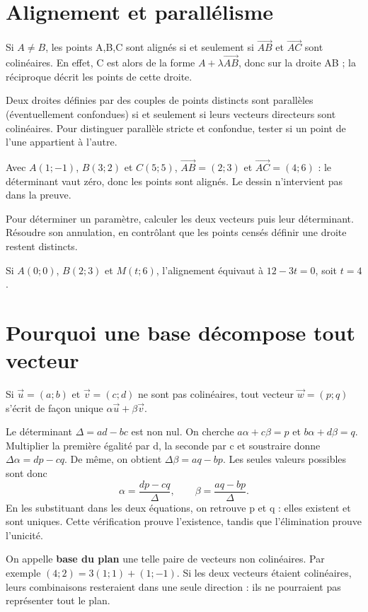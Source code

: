 \documentclass[../cours_2de.tex]{subfiles}
\begin{document}
\section{Alignement et parallélisme}
Si $A\ne B$, les points A,B,C sont alignés si et seulement si $\overrightarrow{AB}$ et $\overrightarrow{AC}$ sont colinéaires. En effet, C est alors de la forme $A+\lambda\overrightarrow{AB}$, donc sur la droite AB ; la réciproque décrit les points de cette droite.

Deux droites définies par des couples de points distincts sont parallèles (éventuellement confondues) si et seulement si leurs vecteurs directeurs sont colinéaires. Pour distinguer parallèle stricte et confondue, tester si un point de l'une appartient à l'autre.
\begin{exemple}
Avec $A(1;-1)$, $B(3;2)$ et $C(5;5)$,
$\overrightarrow{AB}=(2;3)$ et $\overrightarrow{AC}=(4;6)$ : le déterminant vaut zéro, donc les points sont alignés. Le dessin n'intervient pas dans la preuve.
\end{exemple}
\begin{methode}
Pour déterminer un paramètre, calculer les deux vecteurs puis leur déterminant. Résoudre son annulation, en contrôlant que les points censés définir une droite restent distincts.
\end{methode}
Si $A(0;0)$, $B(2;3)$ et $M(t;6)$, l'alignement équivaut à $12-3t=0$, soit $t=4$.
\section{Pourquoi une base décompose tout vecteur}
\begin{theoreme}
Si $\vec u=(a;b)$ et $\vec v=(c;d)$ ne sont pas colinéaires, tout vecteur $\vec w=(p;q)$ s'écrit de façon unique $\alpha\vec u+\beta\vec v$.
\end{theoreme}
\begin{demonstration}
Le déterminant $\Delta=ad-bc$ est non nul. On cherche
$a\alpha+c\beta=p$ et $b\alpha+d\beta=q$.
Multiplier la première égalité par d, la seconde par c et soustraire donne $\Delta\alpha=dp-cq$. De même, on obtient $\Delta\beta=aq-bp$. Les seules valeurs possibles sont donc
\[
\alpha=\frac{dp-cq}{\Delta},\qquad
\beta=\frac{aq-bp}{\Delta}.
\]
En les substituant dans les deux équations, on retrouve p et q : elles existent et sont uniques. Cette vérification prouve l'existence, tandis que l'élimination prouve l'unicité.
\end{demonstration}
On appelle \textbf{base du plan} une telle paire de vecteurs non colinéaires. Par exemple $(4;2)=3(1;1)+(1;-1)$. Si les deux vecteurs étaient colinéaires, leurs combinaisons resteraient dans une seule direction : ils ne pourraient pas représenter tout le plan.
\end{document}
